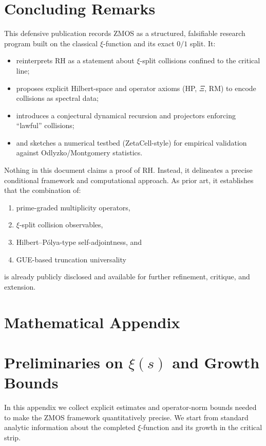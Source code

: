 \documentclass[11pt]{article}
\begin{document}
\section{Concluding Remarks}

This defensive publication records ZMOS as a structured, falsifiable research program built on the classical $\xi$-function and its exact $0/1$ split.  It:
\begin{itemize}
  \item reinterprets RH as a statement about $\xi$-split collisions confined to the critical line;
  \item proposes explicit Hilbert-space and operator axioms (HP, $\Xi$, RM) to encode collisions as spectral data;
  \item introduces a conjectural dynamical recursion and projectors enforcing ``lawful'' collisions;
  \item and sketches a numerical testbed (ZetaCell-style) for empirical validation against Odlyzko/Montgomery statistics.
\end{itemize}

Nothing in this document claims a proof of RH.  Instead, it delineates a precise conditional framework and computational approach.  As prior art, it establishes that the combination of:
\begin{enumerate}
  \item prime-graded multiplicity operators,
  \item $\xi$-split collision observables,
  \item Hilbert--Pólya-type self-adjointness, and
  \item GUE-based truncation universality
\end{enumerate}
is already publicly disclosed and available for further refinement, critique, and extension.

\appendix
\section*{Mathematical Appendix}

\section{Preliminaries on $\xi(s)$ and Growth Bounds}

In this appendix we collect explicit estimates and operator-norm bounds needed to make the ZMOS framework quantitatively precise.  We start from standard analytic information about the completed $\xi$-function and its growth in the critical strip.
\end{document}
